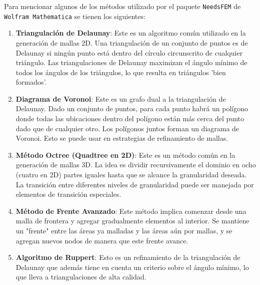 \documentclass[a4paper]{article}
\begin{document}
Para mencionar algunos de los métodos utilizado por el paquete \texttt{NeedsFEM} de \texttt{Wolfram Mathematica} se tienen los siguientes:
\begin{enumerate}
  \item \textbf{Triangulación de Delaunay}: Este es un algoritmo común utilizado en la generación de mallas 2D. Una triangulación de un conjunto de puntos es de Delaunay si ningún punto está dentro del círculo circunscrito de cualquier triángulo. Las triangulaciones de Delaunay maximizan el ángulo mínimo de todos los ángulos de los triángulos, lo que resulta en triángulos 'bien formados'.
  \item \textbf{Diagrama de Voronoi}: Este es un grafo dual a la triangulación de Delaunay. Dado un conjunto de puntos, para cada punto habrá un polígono donde todas las ubicaciones dentro del polígono están más cerca del punto dado que de cualquier otro. Los polígonos juntos forman un diagrama de Voronoi. Esto se puede usar en estrategias de refinamiento de mallas.
  \item \textbf{Método Octree (Quadtree en 2D)}: Este es un método común en la generación de mallas 3D. La idea es dividir recursivamente el dominio en ocho (cuatro en 2D) partes iguales hasta que se alcance la granularidad deseada. La transición entre diferentes niveles de granularidad puede ser manejada por elementos de transición especiales.
  \item \textbf{Método de Frente Avanzado}: Este método implica comenzar desde una malla de frontera y agregar gradualmente elementos al interior. Se mantiene un "frente" entre las áreas ya malladas y las áreas aún por mallas, y se agregan nuevos nodos de manera que este frente avance.
  \item \textbf{Algoritmo de Ruppert}: Esto es un refinamiento de la triangulación de Delaunay que además tiene en cuenta un criterio sobre el ángulo mínimo, lo que lleva a triangulaciones de alta calidad.
  

\end{enumerate}
\end{document}
